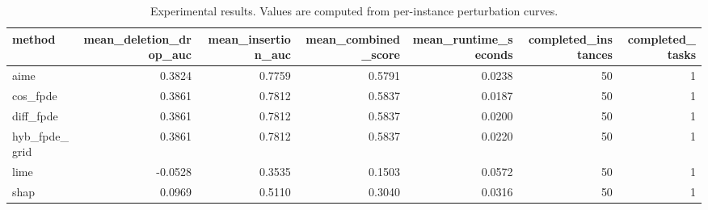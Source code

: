 \begin{table}[t]
\caption{Experimental results. Values are computed from per-instance perturbation curves.}
\label{tab:main_results_computed}
\centering
\begin{tabular}{lrrrrrr}
\toprule
method & mean\_deletion\_drop\_auc & mean\_insertion\_auc & mean\_combined\_score & mean\_runtime\_seconds & completed\_instances & completed\_tasks \\
\midrule
aime & 0.3824 & 0.7759 & 0.5791 & 0.0238 & 50 & 1 \\
cos\_fpde & 0.3861 & 0.7812 & 0.5837 & 0.0187 & 50 & 1 \\
diff\_fpde & 0.3861 & 0.7812 & 0.5837 & 0.0200 & 50 & 1 \\
hyb\_fpde\_grid & 0.3861 & 0.7812 & 0.5837 & 0.0220 & 50 & 1 \\
lime & -0.0528 & 0.3535 & 0.1503 & 0.0572 & 50 & 1 \\
shap & 0.0969 & 0.5110 & 0.3040 & 0.0316 & 50 & 1 \\
\bottomrule
\end{tabular}

\end{table}
